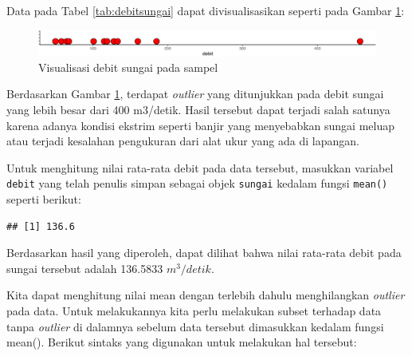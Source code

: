 \documentclass[]{book}
\newenvironment{Shaded}{\begin{snugshade}}{\end{snugshade}}
\newcommand{\KeywordTok}[1]{\textcolor[rgb]{0.13,0.29,0.53}{\textbf{#1}}}
\newcommand{\DecValTok}[1]{\textcolor[rgb]{0.00,0.00,0.81}{#1}}
\newcommand{\StringTok}[1]{\textcolor[rgb]{0.31,0.60,0.02}{#1}}
\newcommand{\CommentTok}[1]{\textcolor[rgb]{0.56,0.35,0.01}{\textit{#1}}}
\newcommand{\OperatorTok}[1]{\textcolor[rgb]{0.81,0.36,0.00}{\textbf{#1}}}
\newcommand{\NormalTok}[1]{#1}
\begin{document}
Data pada Tabel \ref{tab:debitsungai} dapat divisualisasikan seperti
pada Gambar \ref{fig:debitvis}:

\begin{figure}

{\centering \includegraphics[width=0.7\linewidth]{EnvStat_files/figure-latex/debitvis-1} 

}

\caption{Visualisasi debit sungai pada sampel}\label{fig:debitvis}
\end{figure}

Berdasarkan Gambar \ref{fig:debitvis}, terdapat \emph{outlier} yang
ditunjukkan pada debit sungai yang lebih besar dari 400 m3/detik. Hasil
tersebut dapat terjadi salah satunya karena adanya kondisi ekstrim
seperti banjir yang menyebabkan sungai meluap atau terjadi kesalahan
pengukuran dari alat ukur yang ada di lapangan.

Untuk menghitung nilai rata-rata debit pada data tersebut, masukkan
variabel \texttt{debit} yang telah penulis simpan sebagai objek
\texttt{sungai} kedalam fungsi \texttt{mean()} seperti berikut:

\begin{Shaded}
\end{Shaded}

\begin{verbatim}
## [1] 136.6
\end{verbatim}

Berdasarkan hasil yang diperoleh, dapat dilihat bahwa nilai rata-rata
debit pada sungai tersebut adalah 136.5833 \(m^3/detik\).

Kita dapat menghitung nilai mean dengan terlebih dahulu menghilangkan
\emph{outlier} pada data. Untuk melakukannya kita perlu melakukan subset
terhadap data tanpa \emph{outlier} di dalamnya sebelum data tersebut
dimasukkan kedalam fungsi mean(). Berikut sintaks yang digunakan untuk
melakukan hal tersebut:

\begin{Shaded}
\end{Shaded}
\end{document}

